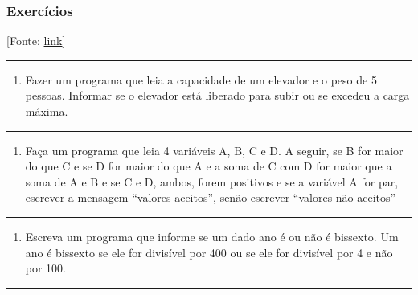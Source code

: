 \documentclass[12pt,a4paper]{article}
\providecommand{\tightlist}{%
      \setlength{\itemsep}{0pt}\setlength{\parskip}{0pt}}
\begin{document}
    \hypertarget{exercuxedcios}{%
\subsubsection{Exercícios}\label{exercuxedcios}}

{[}Fonte:
\href{https://www.studocu.com/pt-br/document/universidade-estadual-da-paraiba/algoritmos/tarefas-obrigatorias/lista-de-exercicio-respondido-em-python-estrutura-condicional/4958982/view}{link}{]}

    \begin{center}\rule{0.5\linewidth}{0.5pt}\end{center}

\begin{enumerate}
\def\labelenumi{\arabic{enumi}.}
\tightlist
\item
  Fazer um programa que leia a capacidade de um elevador e o peso de 5
  pessoas. Informar se o elevador está liberado para subir ou se excedeu
  a carga máxima.
\end{enumerate}

    \begin{center}\rule{0.5\linewidth}{0.5pt}\end{center}

\begin{enumerate}
\def\labelenumi{\arabic{enumi}.}
\setcounter{enumi}{1}
\tightlist
\item
  Faça um programa que leia 4 variáveis A, B, C e D. A seguir, se B for
  maior do que C e se D for maior do que A e a soma de C com D for maior
  que a soma de A e B e se C e D, ambos, forem positivos e se a variável
  A for par, escrever a mensagem ``valores aceitos'', senão escrever
  ``valores não aceitos''
\end{enumerate}

    \begin{center}\rule{0.5\linewidth}{0.5pt}\end{center}

\begin{enumerate}
\def\labelenumi{\arabic{enumi}.}
\setcounter{enumi}{2}
\tightlist
\item
  Escreva um programa que informe se um dado ano é ou não é bissexto. Um
  ano é bissexto se ele for divisível por 400 ou se ele for divisível
  por 4 e não por 100.
\end{enumerate}

    \begin{center}\rule{0.5\linewidth}{0.5pt}\end{center}
\end{document}
